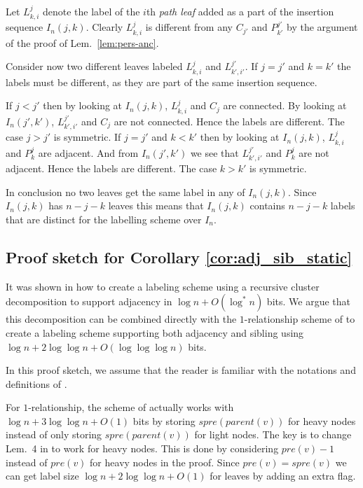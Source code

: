 \documentclass{llncs}
\begin{document}
    Let $L^j_{k,i}$ denote the label of the $i$th \emph{path leaf} added as a
    part of the insertion sequence $I_n(j,k)$. Clearly
    $L^j_{k,i}$ is different from any $C_{j'}$ and $P^{j'}_{k'}$ by the
    argument of the proof of Lem.~\ref{lem:pers-anc}.

    Consider now two different leaves labeled $L^j_{k,i}$ and $L^{j'}_{k',i'}$.
    If $j=j'$ and $k=k'$ the labels must be different, as they are part of the
    same insertion sequence.

    If $j < j'$ then by looking at $I_n(j,k)$, $L^j_{k,i}$ and $C_j$ are connected.
    By looking at $I_n(j',k')$, $L^{j'}_{k',i'}$ and $C_{j}$ are not connected. Hence
    the labels are different. The case $j > j'$ is symmetric.
    If $j = j'$ and $k < k'$ then by looking at $I_n(j,k)$, $L^j_{k,i}$ and $P_{k}^j$
    are adjacent. And from $I_n(j',k')$ we see that $L^{j'}_{k',i'}$ and $P_{k}^j$ are
    not adjacent. Hence the labels are different. The case $k > k'$ is symmetric.

    In conclusion no two leaves get the same label in any of $I_n(j,k)$.	Since $I_n(j,k)$
    has $n-j-k$ leaves this means that $I_n(j,k)$ contains $n-j-k$ labels that are distinct
    for the labelling scheme over $I_n$.



\subsection{Proof sketch for Corollary \ref{cor:adj_sib_static}}
\label{app:adj_sib}

It was shown in \cite{Alstrup02} how to create a labeling scheme
using a recursive cluster decomposition to support adjacency in $\log n +
O(\log^* n)$ bits. We argue that this decomposition can be combined directly
with the $1$-relationship scheme of \cite{Alstrup05} to create a labeling
scheme supporting both adjacency and sibling using $\log n + 2\log\log n +
O(\log\log\log n)$ bits.

In this proof sketch, we assume that the reader is
familiar with the notations and definitions of \cite{Alstrup02,Alstrup05}.

For $1$-relationship, the scheme of \cite{Alstrup05} actually works with
$\log n + 3\log\log n + O(1)$ bits by storing $spre(parent(v))$ for heavy
nodes instead of only storing $spre(parent(v))$ for light nodes.
The key is to change Lem.~4 in \cite{Alstrup05} to work for heavy nodes. This
is done by considering $pre(v) - 1$ instead of $pre(v)$ for heavy nodes
in the proof. Since
$pre(v) = spre(v)$ we can get label size $\log n + 2\log\log n+O(1)$ for leaves by
adding an extra flag.
\end{document}
